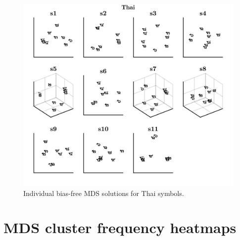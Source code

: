 \begin{figure}[tbh]
\centering \includegraphics[scale = .67]{Figures/Appendix/AppE/Biased_Indiv_MDS_4.jpg}
\caption{Individual bias-free MDS solutions for Thai symbols.}
\label{fig:Apx_MDSthaiBiased_Cross}
\end{figure}


\clearpage
\section{MDS cluster frequency heatmaps}
\label{Appendix:ClusterFq}


